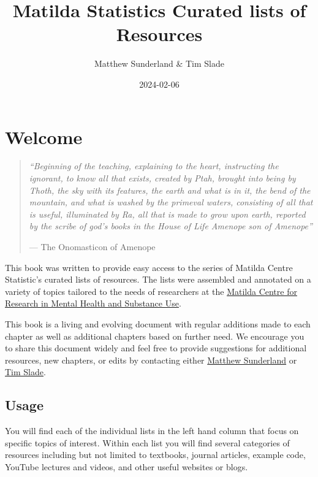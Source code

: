 \documentclass[
]{book}
\title{Matilda Statistics Curated lists of Resources}
\author{Matthew Sunderland \& Tim Slade}
\date{2024-02-06}
\begin{document}
\maketitle

{
\setcounter{tocdepth}{1}
\tableofcontents
}
\hypertarget{welcome}{%
\chapter{Welcome}\label{welcome}}

\begin{quote}
\emph{``Beginning of the teaching, explaining to the heart, instructing the ignorant, to know all that exists, created by Ptah, brought into being by Thoth, the sky with its features, the earth and what is in it, the bend of the mountain, and what is washed by the primeval waters, consisting of all that is useful, illuminated by Ra, all that is made to grow upon earth, reported by the scribe of god's books in the House of Life Amenope son of Amenope''}

--- The Onomasticon of Amenope
\end{quote}

This book was written to provide easy access to the series of Matilda Centre Statistic's curated lists of resources. The lists were assembled and annotated on a variety of topics tailored to the needs of researchers at the \href{https://www.sydney.edu.au/matilda-centre/}{Matilda Centre for Research in Mental Health and Substance Use}.

This book is a living and evolving document with regular additions made to each chapter as well as additional chapters based on further need. We encourage you to share this document widely and feel free to provide suggestions for additional resources, new chapters, or edits by contacting either \href{mailto:\%20matthew.sunderland@sydney.edu.au}{Matthew Sunderland} or \href{mailto:\%20tim.slade@sydney.edu.au}{Tim Slade}.

\hypertarget{usage}{%
\section{Usage}\label{usage}}

You will find each of the individual lists in the left hand column that focus on specific topics of interest. Within each list you will find several categories of resources including but not limited to textbooks, journal articles, example code, YouTube lectures and videos, and other useful websites or blogs.
\end{document}
